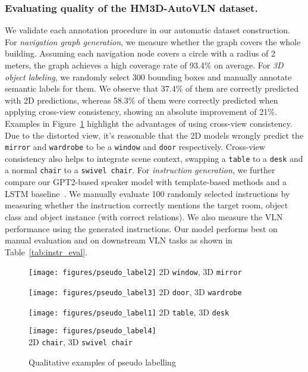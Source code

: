 \subsubsection{Evaluating quality of the HM3D-AutoVLN dataset.}
We validate each annotation procedure in our automatic dataset construction.
For \emph{navigation graph generation}, we measure whether the graph covers the whole building. Assuming each navigation node covers a circle with a radius of 2 meters, the graph achieves a high coverage rate of 93.4\% on average.
For \emph{3D object labeling}, we randomly select 300 bounding boxes and manually annotate semantic labels for them. We observe that 37.4\% of them are correctly predicted with 2D predictions, whereas 58.3\% of them were correctly predicted when applying cross-view consistency, showing an absolute improvement of 21\%.
Examples in Figure~\ref{fig:quality_pseudolabels} highlight the advantages of using cross-view consistency.
Due to the distorted view, it's reasonable that the 2D models wrongly predict the \texttt{mirror} and \texttt{wardrobe} to be a \texttt{window} and \texttt{door} respectively.
Cross-view consistency also helps to integrate scene context, swapping a \texttt{table} to a \texttt{desk} and a normal \texttt{chair} to a \texttt{swivel chair}.
For \emph{instruction generation}, we further compare our GPT2-based speaker model with template-based methods and a LSTM baseline~\cite{chen2022duet}. 
We manually evaluate 100 randomly selected instructions by measuring whether the instruction correctly mentions the target room, object class and object instance (with correct relations). We also measure the VLN performance using the generated instructions. Our model performs best on manual evaluation and on downstream VLN tasks as shown in Table~\ref{tab:instr_eval}. 





\begin{figure}[t]
    \scriptsize
    \begin{minipage}{.25\linewidth}
      \centering
                \texttt{[image: figures/pseudo\_label2]}
                2D \texttt{window}, 3D \texttt{mirror}
    \end{minipage}\begin{minipage}{.25\linewidth}
      \centering
                \texttt{[image: figures/pseudo\_label3]}
                2D \texttt{door}, 3D \texttt{wardrobe}
    \end{minipage}
    \begin{minipage}{.25\linewidth}
      \centering
                \texttt{[image: figures/pseudo\_label1]}
                2D \texttt{table}, 3D \texttt{desk}
    \end{minipage}\begin{minipage}{.3\linewidth}
      \centering
                \texttt{[image: figures/pseudo\_label4]}\\
                2D \texttt{chair}, 3D \texttt{swivel chair}
    \end{minipage}
        \caption{Qualitative examples of pseudo labelling}
        \label{fig:quality_pseudolabels}
\end{figure}


